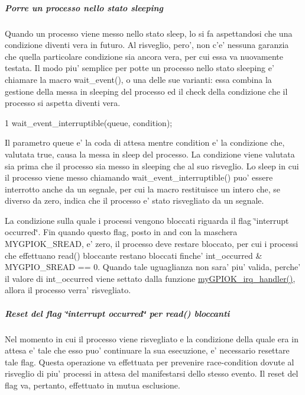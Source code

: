 \subparagraph*{Porre un processo nello stato sleeping}

Quando un processo viene messo nello stato sleep, lo si fa aspettandosi che una condizione diventi vera in futuro. Al risveglio, pero', non c'e' nessuna garanzia che quella particolare condizione sia ancora vera, per cui essa va nuovamente testata. Il modo piu' semplice per potte un processo nello stato sleeping e' chiamare la macro wait\+\_\+event(), o una delle sue varianti\+: essa combina la gestione della messa in sleeping del processo ed il check della condizione che il processo si aspetta diventi vera. 
\begin{DoxyCode}
1 wait\_event\_interruptible(queue, condition);
\end{DoxyCode}
 Il parametro queue e' la coda di attesa mentre condition e' la condizione che, valutata true, causa la messa in sleep del processo. La condizione viene valutata sia prima che il processo sia messo in sleeping che al suo risveglio. Lo sleep in cui il processo viene messo chiamando wait\+\_\+event\+\_\+interruptible() puo' essere interrotto anche da un segnale, per cui la macro restituisce un intero che, se diverso da zero, indica che il processo e' stato risvegliato da un segnale.

La condizione sulla quale i processi vengono bloccati riguarda il flag \char`\"{}interrupt occurred\char`\"{}. Fin quando questo flag, posto in and con la maschera M\+Y\+G\+P\+I\+O\+K\+\_\+\+S\+R\+E\+A\+D, e' zero, il processo deve restare bloccato, per cui i processi che effettuano read() bloccante restano bloccati finche' int\+\_\+occurred \& M\+Y\+G\+P\+I\+O\+\_\+\+S\+R\+E\+A\+D == 0. Quando tale uguaglianza non sara' piu' valida, perche' il valore di int\+\_\+occurred viene settato dalla funzione \hyperlink{group___linux-_driver_ga2fc230a12a97aa63e43b2dc4aec73511}{my\+G\+P\+I\+O\+K\+\_\+irq\+\_\+handler()}, allora il processo verra' risvegliato.

\subparagraph*{Reset del flag \char`\"{}interrupt occurred\char`\"{} per read() bloccanti}

Nel momento in cui il processo viene risvegliato e la condizione della quale era in attesa e' tale che esso puo' continuare la sua esecuzione, e' necessario resettare tale flag. Questa operazione va effettuata per prevenire race-\/condition dovute al risveglio di piu' processi in attesa del manifestarsi dello stesso evento. Il reset del flag va, pertanto, effettuato in mutua esclusione.

